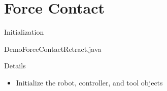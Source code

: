 \documentclass{beamer}
\begin{document}
\section{Force Contact}

\begin{frame}{Initialization}

  \begin{block}{DemoForceContactRetract.java}
    \resizebox{\textwidth}{!}{
    
    }
  \end{block}

  \begin{block}{Details}
    \begin{itemize}
      \item Initialize the robot, controller, and tool objects
    \end{itemize}
  \end{block}
\end{frame}
\end{document}
